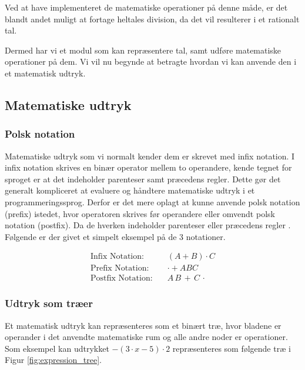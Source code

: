 Ved at have implementeret de matematiske operationer på denne måde, er det blandt andet muligt at fortage heltales division, da det vil resulterer i et rationalt tal.

Dermed har vi et modul som kan repræsentere tal, samt udføre matematiske operationer på dem. Vi vil nu begynde at betragte hvordan vi kan anvende den i et matematisk udtryk.

\subsection{Matematiske udtryk}
\subsubsection{Polsk notation}
Matematiske udtryk som vi normalt kender dem er skrevet med infix notation. I infix notation skrives en binær operator mellem to operandere, kende tegnet for sproget er at det indeholder parenteser samt præcedens regler. Dette gør det generalt kompliceret at evaluere og håndtere matematiske udtryk i et programmeringssprog. Derfor er det mere oplagt at kunne anvende polsk notation (prefix) istedet, hvor operatoren skrives før operandere eller omvendt polsk notation (postfix). Da de hverken indeholder parenteser eller præcedens regler . Følgende er der givet et simpelt eksempel på de 3 notationer. 

\begin{align*}
    \text{Infix Notation:} \quad & (A + B) \cdot C \\
    \text{Prefix Notation:} \quad &  \cdot + A B C  \\
    \text{Postfix Notation:} \quad & A \, B \, + \, C \, \cdot
\end{align*}

 

\subsubsection{Udtryk som træer} \label{sec:expression_as_trees}
Et matematisk udtryk kan repræsenteres som et binært træ, hvor bladene er operander i det anvendte matematiske rum og alle andre noder er operationer. Som eksempel kan udtrykket $-(3 \cdot x - 5) \cdot 2$ repræsenteres som følgende træ i Figur \ref{fig:expression_tree}. 


